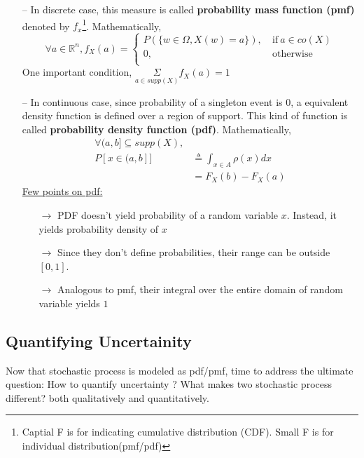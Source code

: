 \documentclass[12pt]{report} %
\begin{document}
	\begin{enumerate}[noitemsep,topsep=0pt]
		\item [--] In discrete case, this measure is called \textbf{probability mass function (pmf)} denoted by $f_x$\footnote{Captial F is for indicating cumulative distribution (CDF). Small F is for individual distribution(pmf/pdf)}. Mathematically, 
		\begin{equation}
			\forall a \in \mathbb{R}^{n}, f_X(a) = 
			\begin{cases}
				P(\{w \in \Omega, X(w) = a\}), &\ \text{if} \ a \in co(X)\\
				0, &\ \text{otherwise}\\
			\end{cases}
		\end{equation}
		One important condition, $\underset{a \in supp(X)}{\Sigma}f_X(a) = 1$
		\item [--] In continuous case, since probability of a singleton event is $0$, a equivalent density function is defined over a region of support. This kind of function is called \textbf{probability density function (pdf)}. Mathematically, 
		\begin{equation}
		\begin{aligned}
		\forall (a,b] \subseteq supp(X), \\
		P[x \in (a,b]] &\triangleq \int_{x \in A} \rho(x)dx\\
					   &= F_X(b) - F_X(a)
		\end{aligned}
		\end{equation}
		\underline{Few points on pdf:}
		\begin{enumerate}
			\item[$\rightarrow$] PDF doesn't yield probability of a random variable $x$. Instead, it yields probability density of $x$
			\item[$\rightarrow$] Since they don't define probabilities, their range can be outside $[0,1]$. 
			\item[$\rightarrow$] Analogous to pmf, their integral over the entire domain of random variable yields $1$
		\end{enumerate}
	\end{enumerate}

	\subsection*{Quantifying Uncertainity}
	Now that stochastic process is modeled as pdf/pmf, time to address the ultimate question: How to quantify uncertainty ? What makes two stochastic process different? both qualitatively and quantitatively.  \\
	
\end{document}
